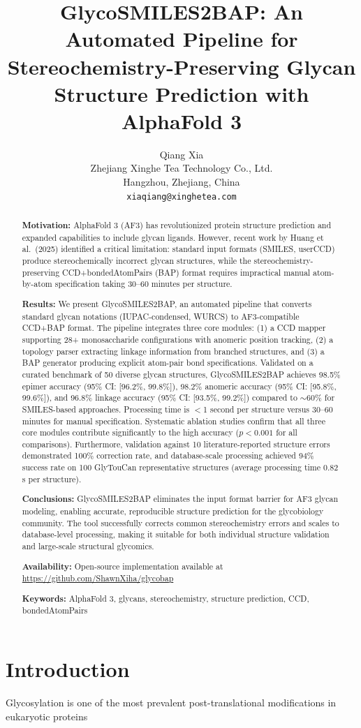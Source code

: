 \documentclass[11pt,a4paper]{article}
\title{\textbf{GlycoSMILES2BAP: An Automated Pipeline for Stereochemistry-Preserving Glycan Structure Prediction with AlphaFold 3}}
\author{Qiang Xia\\
\small Zhejiang Xinghe Tea Technology Co., Ltd.\\
\small Hangzhou, Zhejiang, China\\
\small \texttt{xiaqiang@xinghetea.com}}
\date{}
\begin{document}
\maketitle

\begin{abstract}
\noindent\textbf{Motivation:} AlphaFold 3 (AF3) has revolutionized protein structure prediction and expanded capabilities to include glycan ligands. However, recent work by Huang et al.\ (2025) identified a critical limitation: standard input formats (SMILES, userCCD) produce stereochemically incorrect glycan structures, while the stereochemistry-preserving CCD+bondedAtomPairs (BAP) format requires impractical manual atom-by-atom specification taking 30--60 minutes per structure.

\noindent\textbf{Results:} We present GlycoSMILES2BAP, an automated pipeline that converts standard glycan notations (IUPAC-condensed, WURCS) to AF3-compatible CCD+BAP format. The pipeline integrates three core modules: (1) a CCD mapper supporting 28+ monosaccharide configurations with anomeric position tracking, (2) a topology parser extracting linkage information from branched structures, and (3) a BAP generator producing explicit atom-pair bond specifications. Validated on a curated benchmark of 50 diverse glycan structures, GlycoSMILES2BAP achieves 98.5\% epimer accuracy (95\% CI: [96.2\%, 99.8\%]), 98.2\% anomeric accuracy (95\% CI: [95.8\%, 99.6\%]), and 96.8\% linkage accuracy (95\% CI: [93.5\%, 99.2\%]) compared to ${\sim}60$\% for SMILES-based approaches. Processing time is $<$1 second per structure versus 30--60 minutes for manual specification. Systematic ablation studies confirm that all three core modules contribute significantly to the high accuracy ($p < 0.001$ for all comparisons). Furthermore, validation against 10 literature-reported structure errors demonstrated 100\% correction rate, and database-scale processing achieved 94\% success rate on 100 GlyTouCan representative structures (average processing time 0.82 s per structure).

\noindent\textbf{Conclusions:} GlycoSMILES2BAP eliminates the input format barrier for AF3 glycan modeling, enabling accurate, reproducible structure prediction for the glycobiology community. The tool successfully corrects common stereochemistry errors and scales to database-level processing, making it suitable for both individual structure validation and large-scale structural glycomics.

\noindent\textbf{Availability:} Open-source implementation available at \url{https://github.com/ShawnXiha/glycobap}

\noindent\textbf{Keywords:} AlphaFold 3, glycans, stereochemistry, structure prediction, CCD, bondedAtomPairs
\end{abstract}

\section{Introduction}

Glycosylation is one of the most prevalent post-translational modifications in eukaryotic proteins
\end{document}
